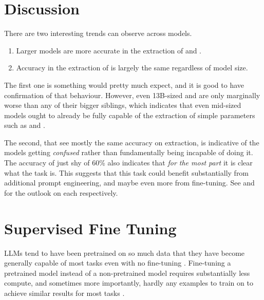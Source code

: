

\section{Discussion}\label{sec:discussion}
There are two interesting trends  can observe across models.

\begin{enumerate}
    \item Larger models are more accurate in the extraction of \ttemp and \ttime.
    \item Accuracy in the extraction of \tsolv is largely the same regardless of model size.
\end{enumerate}

The first one is something  would pretty much expect, and it is good to have confirmation of that behaviour.
However, even 13B-sized  and  are only marginally worse than any of their bigger siblings, which indicates that even mid-sized models ought to already be fully capable of the extraction of simple parameters such as \ttemp and \ttime.

The second, that  see mostly the same accuracy on \tsolv extraction, is indicative of the models getting \textit{confused} rather than fundamentally being incapable of doing it.
The accuracy of just shy of 60\% also indicates that \textit{for the most part} it is clear what the task is.
This suggests that this task could benefit substantially from additional prompt engineering, and maybe even more from fine-tuning. See  and  for the outlook on each respectively.





\section{Supervised Fine Tuning}\label{sec:sft}
\glspl{LLM} tend to have been pretrained on so much data that they have become generally capable of most tasks even with no fine-tuning \cite{brown_language_2020}.
Fine-tuning a pretrained model instead of a non-pretrained model requires substantially less compute, and sometimes more importantly, hardly any examples to train on to achieve similar results for most tasks \cite{gaddipati_comparative_2020}.

